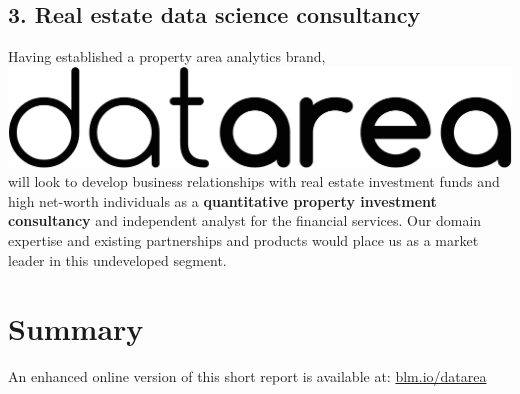 \documentclass[
10pt, %
a4paper, %
oneside, %
headinclude,footinclude, %
BCOR5mm, %
]{scrartcl}
\newcommand*{\logo}{\includegraphics[scale=.04]{Figures/logotext.png}}
\begin{document}
\subsection*{3. Real estate data science consultancy}

Having established a property area analytics brand, \logo\hspace{.1em}
will look to develop business relationships with real estate
investment funds and high net-worth individuals as a {\bf quantitative
  property investment consultancy} and independent analyst for the
financial services. Our domain expertise and existing partnerships and
products would place us as a market leader in this undeveloped
segment.

\section*{Summary}




\vspace{1em}
\begin{flushright} {\small An enhanced online version of this short
    report is available at:
    \leavevmode\href{http://blm.io/datarea}{blm.io/datarea}}
\end{flushright}
\end{document}
